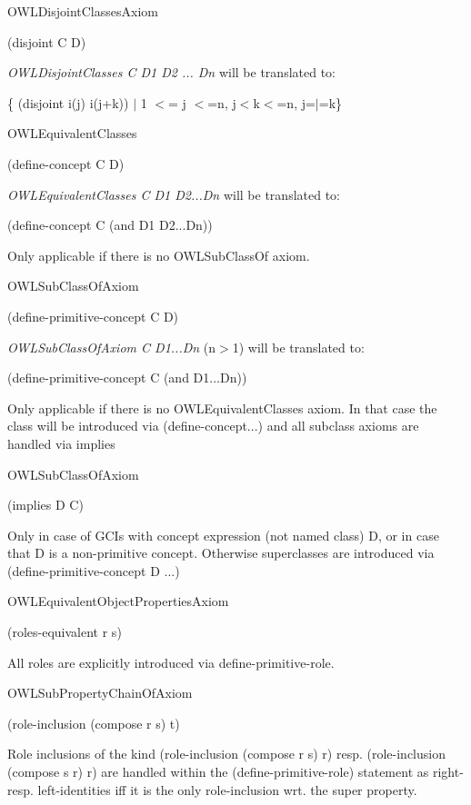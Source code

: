 O\-W\-L\-Disjoint\-Classes\-Axiom 

(disjoint C D) 

{\itshape O\-W\-L\-Disjoint\-Classes C D1 D2 ... Dn} will be translated to\-: \par
 \{ (disjoint i(j) i(j+k)) $|$ 1 $<$= j $<$=n, j$<$k$<$=n, j=$|$=k\} \par
   

O\-W\-L\-Equivalent\-Classes 

(define-\/concept C D) 

{\itshape O\-W\-L\-Equivalent\-Classes C D1 D2...Dn} will be translated to\-:\par
 (define-\/concept C (and D1 D2...Dn)) 

Only applicable if there is no O\-W\-L\-Sub\-Class\-Of axiom. 

O\-W\-L\-Sub\-Class\-Of\-Axiom 

(define-\/primitive-\/concept C D)  

{\itshape O\-W\-L\-Sub\-Class\-Of\-Axiom C D1...Dn} (n$>$1) will be translated to\-:\par
 (define-\/primitive-\/concept C (and D1...Dn)) 

Only applicable if there is no O\-W\-L\-Equivalent\-Classes axiom. In that case the class will be introduced via (define-\/concept...) and all subclass axioms are handled via implies \par
   

O\-W\-L\-Sub\-Class\-Of\-Axiom 

(implies D C) 

Only in case of G\-C\-Is with concept expression (not named class) D, or in case that D is a non-\/primitive concept. Otherwise superclasses are introduced via (define-\/primitive-\/concept D ...)   

O\-W\-L\-Equivalent\-Object\-Properties\-Axiom 

(roles-\/equivalent r s) 

All roles are explicitly introduced via define-\/primitive-\/role.  

O\-W\-L\-Sub\-Property\-Chain\-Of\-Axiom 

(role-\/inclusion (compose r s) t) 

Role inclusions of the kind (role-\/inclusion (compose r s) r) resp. (role-\/inclusion (compose s r) r) are handled within the (define-\/primitive-\/role) statement as right-\/ resp. left-\/identities iff it is the only role-\/inclusion wrt. the super property.  

